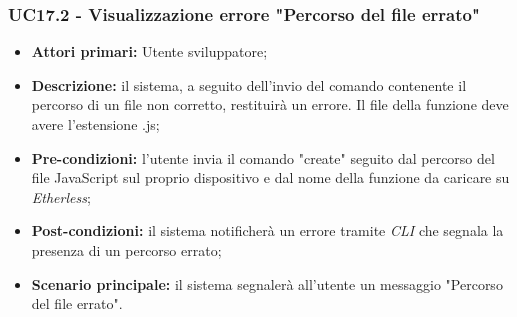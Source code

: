 \subsubsection{UC17.2 - Visualizzazione errore "Percorso del file errato"}
\begin{itemize}
	\item \textbf{Attori primari:} Utente sviluppatore;
	\item \textbf{Descrizione:} il sistema, a seguito dell'invio del comando contenente il percorso di un file non corretto, restituirà un errore. Il file della funzione deve avere l'estensione .js;
	\item \textbf{Pre-condizioni:}  l'utente invia il comando "create" seguito dal percorso del file JavaScript sul proprio dispositivo e dal nome della funzione da caricare su \textit{Etherless};
	\item \textbf{Post-condizioni:} il sistema notificherà un errore tramite \textit{CLI\glo} che segnala la presenza di un percorso errato;
	\item \textbf{Scenario principale:} il sistema segnalerà all'utente un messaggio "Percorso del file errato".
\end{itemize}